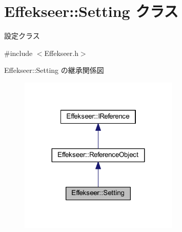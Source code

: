 \hypertarget{class_effekseer_1_1_setting}{}\section{Effekseer\+:\+:Setting クラス}
\label{class_effekseer_1_1_setting}


設定クラス  




{\ttfamily \#include $<$Effekseer.\+h$>$}



Effekseer\+:\+:Setting の継承関係図\nopagebreak
\begin{figure}[H]
\begin{center}
\leavevmode
\includegraphics[width=215pt]{class_effekseer_1_1_setting__inherit__graph}
\end{center}
\end{figure}
